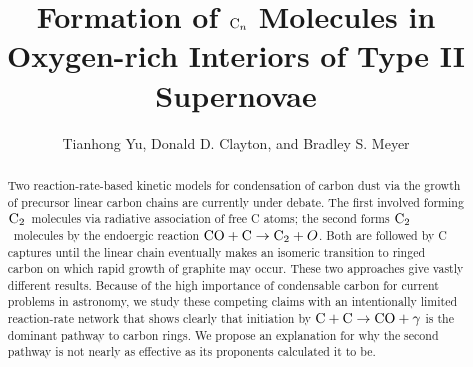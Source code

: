 \documentclass[manuscript]{aastex}
\newcommand{\ctwo}{${\rm C}_2$}
\begin{document}

\title{Formation of ${\rm C}_n$ Molecules in Oxygen-rich Interiors of Type II
Supernovae}


\author{Tianhong Yu, Donald D. Clayton, and Bradley S. Meyer}



\begin{abstract}
Two reaction-rate-based kinetic models for condensation of carbon dust via the
growth of precursor linear carbon chains are currently under debate. The first
involved forming \ctwo\ molecules via radiative association of free C
atoms; the second forms \ctwo\ molecules by the endoergic reaction
${\rm CO} + {\rm C} \to {\rm C}_2 + O$. Both are
followed by C captures until the linear chain eventually makes an isomeric
transition to ringed carbon on which rapid growth of graphite may occur.
These two approaches give vastly different results. Because of the high
importance of condensable carbon for current problems in astronomy,
we study these competing claims with an intentionally limited reaction-rate
network that shows clearly that initiation by
${\rm C} + {\rm C} \to {\rm CO} + \gamma$  is the dominant
pathway to carbon rings. We propose an explanation for why the second pathway
is not nearly as effective as its proponents calculated it to be.
\end{abstract}
\end{document}

